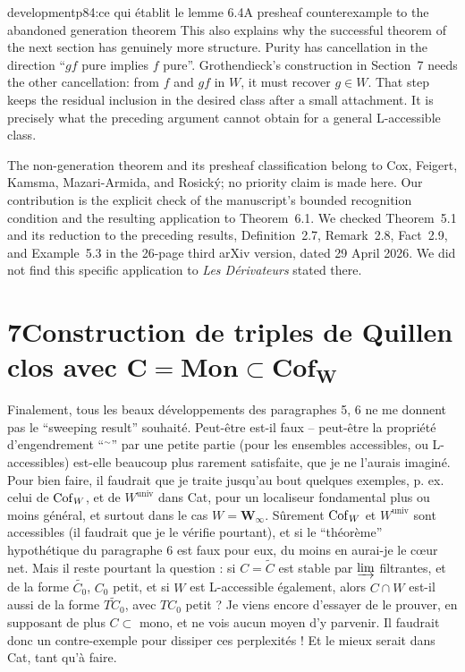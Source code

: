 \begin{dcomment}{development}{p84:ce qui établit le lemme 6.4}{A presheaf counterexample to the abandoned generation theorem}
This also explains why the successful theorem of the next section has genuinely more structure. Purity has cancellation in the direction ``$gf$ pure implies $f$ pure''. Grothendieck's construction in Section~7 needs the other cancellation: from $f$ and $gf$ in $W$, it must recover $g\in W$. That step keeps the residual inclusion in the desired class after a small attachment. It is precisely what the preceding argument cannot obtain for a general L-accessible class.

The non-generation theorem and its presheaf classification belong to Cox, Feigert, Kamsma, Mazari-Armida, and Rosick\'{y}; no priority claim is made here. Our contribution is the explicit check of the manuscript's bounded recognition condition and the resulting application to Theorem~6.1. We checked Theorem~5.1 and its reduction to the preceding results, Definition~2.7, Remark~2.8, Fact~2.9, and Example~5.3 in the 26-page third arXiv version, dated 29 April 2026. We did not find this specific application to \emph{Les D\'erivateurs} stated there.
\end{dcomment}


\section*{7\quad Construction de triples de Quillen clos avec $\boldsymbol{C} = \mathbf{Mon} \subset \mathbf{Cof}_{\boldsymbol{W}}$}

Finalement, tous les beaux développements des paragraphes 5, 6 ne me donnent pas le “sweeping result” souhaité. Peut-être est-il faux -- peut-être la propriété d'engendrement
“$^{\sim}$” par une petite partie (pour les ensembles accessibles, ou L-accessibles) est-elle beaucoup plus rarement satisfaite, que je ne l'aurais imaginé. Pour bien faire, il faudrait que je traite jusqu'au %
bout quelques exemples, p. ex. celui de $\mathrm{Cof}_W$, et de $W^{\mathrm{univ}}$ dans Cat, pour un localiseur fondamental plus ou moins général, et surtout dans le cas $W = \mathbf{W}_{\infty}$. Sûrement $\mathrm{Cof}_W$ et $W^{\mathrm{univ}}$ sont accessibles (il faudrait que je le vérifie pourtant), et si le “théorème” hypothétique du paragraphe 6 est faux pour eux, du moins en aurai-je le cœur net. Mais il reste pourtant la question : si $C = \widetilde{C}$ est stable par $\varinjlim$ filtrantes, et de la forme $\widetilde{C_0}$, $C_0$ petit, et si $W$ est L-accessible également, alors $C \cap W$ est-il aussi de la forme $\widetilde{TC_0}$, avec $TC_0$ petit ? Je viens encore d'essayer de le prouver, en supposant de plus $C \subset$ mono, et ne vois aucun moyen d'y parvenir. Il faudrait donc un contre-exemple pour dissiper ces perplexités ! Et le mieux serait dans Cat, tant qu'à faire.

